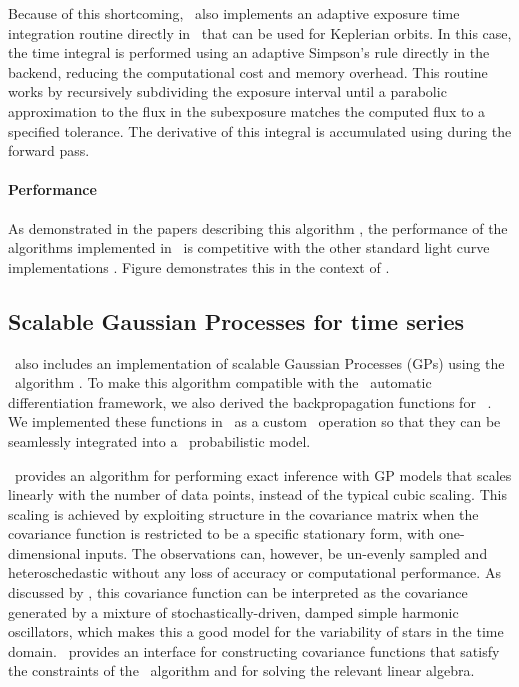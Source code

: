 \documentclass[modern]{aastex62}
\begin{document}
Because of this shortcoming, \exoplanet\ also implements an adaptive exposure time integration routine directly in \cpp\ that can be used for Keplerian orbits.
In this case, the time integral is performed using an adaptive Simpson's rule  directly in the backend, reducing the computational cost and memory overhead.
This routine works by recursively subdividing the exposure interval until a parabolic approximation to the flux in the subexposure matches the computed flux to a specified tolerance.
The derivative of this integral is accumulated using during the forward pass.

\paragraph{Performance}
As demonstrated in the papers describing this algorithm \citep{Luger:2019} , the performance of the algorithms implemented in \starry\ is competitive with the other standard light curve implementations .
Figure  demonstrates this in the context of \exoplanet.


\subsection{Scalable Gaussian Processes for time series}

\exoplanet\ also includes an implementation of scalable Gaussian Processes (GPs) using the \celerite\ algorithm \citep{Foreman-Mackey:2017}.
To make this algorithm compatible with the \theano\ automatic differentiation framework, we also derived the backpropagation functions for \celerite\ \citep{Foreman-Mackey:2018a}.
We implemented these functions in \cpp\ as a custom \theano\ operation so that they can be seamlessly integrated into a \pymc\ probabilistic model.

\celerite\ provides an algorithm for performing exact inference with GP models that scales linearly with the number of data points, instead of the typical cubic scaling.
This scaling is achieved by exploiting structure in the covariance matrix when the covariance function is restricted to be a specific stationary form, with one-dimensional inputs.
The observations can, however, be un-evenly sampled and heteroschedastic without any loss of accuracy or computational performance.
As discussed by \citet{Foreman-Mackey:2017}, this covariance function can be interpreted as the covariance generated by a mixture of stochastically-driven, damped simple harmonic oscillators, which makes this a good model for the variability of stars in the time domain.
\exoplanet\ provides an interface for constructing covariance functions that satisfy the constraints of the \celerite\ algorithm and for solving the relevant linear algebra.
\end{document}
